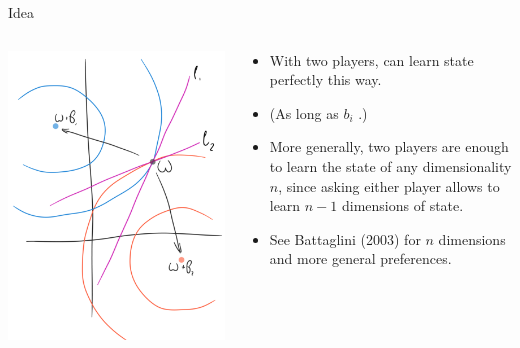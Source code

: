 \documentclass[english,10pt
,aspectratio=169
]{beamer}
\begin{document}
\begin{frame}{Idea}
\begin{columns}
	\begin{column}{0.5\textwidth}
		\begin{center}
			\includegraphics[scale=0.18]{pics/M4/battaglini03.png}
		\end{center}
	\end{column}
	\begin{column}{0.5\textwidth}
		{\small
			\begin{itemize}
				\item With two players, can learn state perfectly this way.
				\item (As long as $b_i$ .)
				\item More generally, two players are enough to learn the state of any dimensionality $n$, since asking either player allows to learn $n-1$ dimensions of state.
				\item See Battaglini (2003) for $n$ dimensions and more general preferences.
			\end{itemize}
		}
	\end{column}
\end{columns}
\end{frame}
\end{document}
